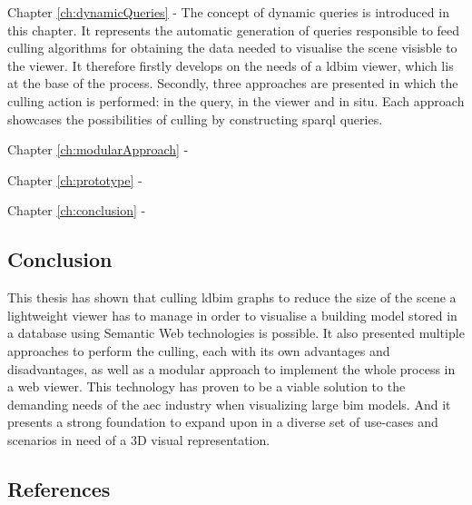 \begin{refsection}
\begin{multicols}{2}

        \textsf{Chapter \ref{ch:dynamicQueries} -}
        The concept of dynamic queries is introduced in this chapter. It represents the automatic generation of queries responsible to feed culling algorithms for obtaining the data needed to visualise the scene visisble to the viewer. It therefore firstly develops on the needs of a \ac{ldbim} viewer, which lis at the base of the process. Secondly, three approaches are presented in which the culling action is performed: in the query, in the viewer and in situ. Each approach showcases the possibilities of culling by constructing \ac{sparql} queries.

        \textsf{Chapter \ref{ch:modularApproach} -}


        \textsf{Chapter \ref{ch:prototype} -}

        \textsf{Chapter \ref{ch:conclusion} -}

        \subsection*{Conclusion}
        This thesis has shown that culling \ac{ldbim} graphs to reduce the size of the scene a lightweight viewer has to manage in order to visualise a building model stored in a database using Semantic Web technologies is possible. It also presented multiple approaches to perform the culling, each with its own advantages and disadvantages, as well as a modular approach to implement the whole process in a web viewer. This technology has proven to be a viable solution to the demanding needs of the \ac{aec} industry when visualizing large \ac{bim} models. And it presents a strong foundation to expand upon in a diverse set of use-cases and scenarios in need of a 3D visual representation.
        \subsection*{References}
        \printbibliography

    \end{multicols}
\end{refsection}

\restoregeometry